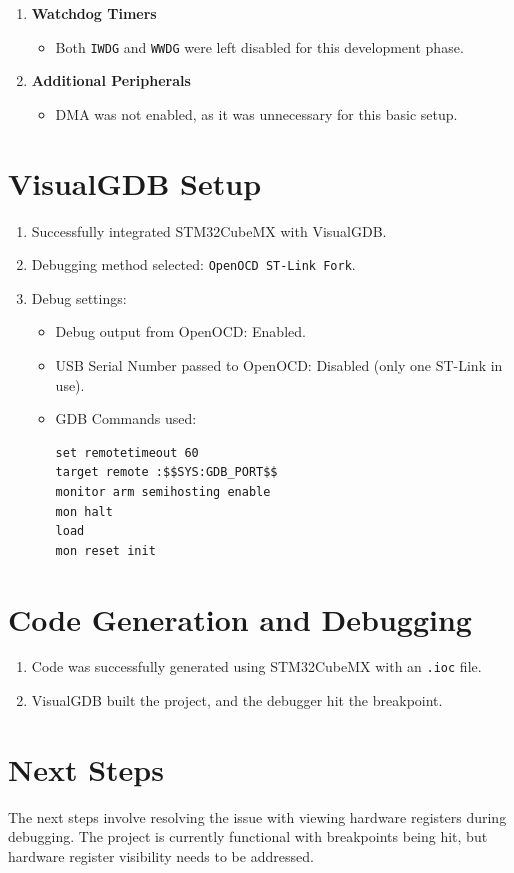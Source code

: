 \documentclass{article}
\begin{document}
\begin{enumerate}
    \item \textbf{Watchdog Timers}
    \begin{itemize}
        \item Both \texttt{IWDG} and \texttt{WWDG} were left disabled for this development phase.
    \end{itemize}

    \item \textbf{Additional Peripherals}
    \begin{itemize}
        \item DMA was not enabled, as it was unnecessary for this basic setup.
    \end{itemize}
\end{enumerate}

\section{VisualGDB Setup}
\begin{enumerate}
    \item Successfully integrated STM32CubeMX with VisualGDB.
    \item Debugging method selected: \texttt{OpenOCD ST-Link Fork}.
    \item Debug settings:
    \begin{itemize}
        \item Debug output from OpenOCD: Enabled.
        \item USB Serial Number passed to OpenOCD: Disabled (only one ST-Link in use).
        \item GDB Commands used:
        \begin{lstlisting}
set remotetimeout 60
target remote :$$SYS:GDB_PORT$$
monitor arm semihosting enable
mon halt
load
mon reset init
        \end{lstlisting}
    \end{itemize}
\end{enumerate}

\section{Code Generation and Debugging}
\begin{enumerate}
    \item Code was successfully generated using STM32CubeMX with an \texttt{.ioc} file.
    \item VisualGDB built the project, and the debugger hit the breakpoint.
\end{enumerate}

\section{Next Steps}
The next steps involve resolving the issue with viewing hardware registers during debugging. The project is currently functional with breakpoints being hit, but hardware register visibility needs to be addressed.
\end{document}
